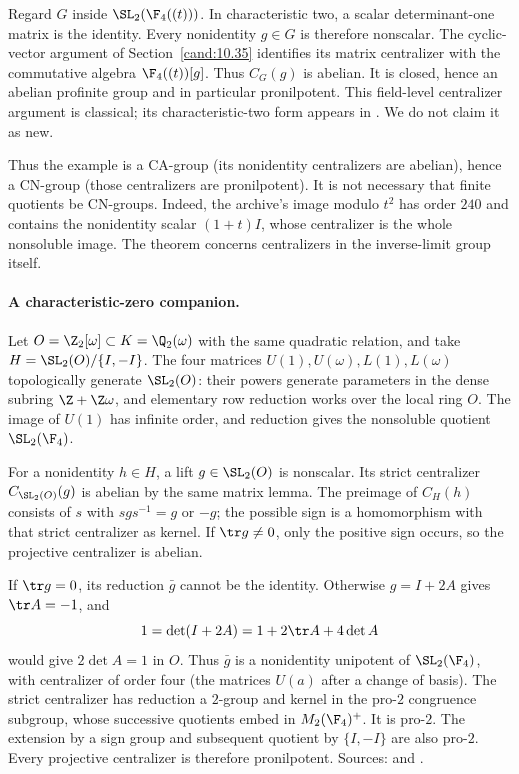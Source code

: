 Regard \(G\) inside \(\SL_2(\F_4((t)))\). In characteristic
two, a scalar determinant-one matrix is the identity.
Every nonidentity \(g\in G\) is therefore nonscalar.
The cyclic-vector argument of Section~\ref{cand:10.35}
identifies its matrix centralizer with the commutative algebra
\(\F_4((t))[g]\). Thus \(C_G(g)\) is abelian.
It is closed, hence an abelian profinite group and in
particular pronilpotent. This field-level centralizer
argument is classical; its characteristic-two form appears
in \cite{fine-ct}. We do not claim it as new.

Thus the example is a CA-group (its nonidentity centralizers are
abelian), hence a CN-group (those centralizers are pronilpotent).
It is not necessary that finite quotients be CN-groups.
Indeed, the archive's image modulo \(t^2\) has order \(240\)
and contains the nonidentity scalar \((1+t)I\), whose
centralizer is the whole nonsoluble image. The theorem
concerns centralizers in the inverse-limit group itself.

\paragraph{A characteristic-zero companion.}
Let \(O=\Z_2[\omega]\subset K=\Q_2(\omega)\) with the same
quadratic relation, and take
\(H=\SL_2(O)/\{I,-I\}\).
The four matrices \(U(1),U(\omega),L(1),L(\omega)\)
topologically generate \(\SL_2(O)\): their powers generate
parameters in the dense subring \(\Z+\Z\omega\), and
elementary row reduction works over the local ring \(O\).
The image of \(U(1)\) has infinite order, and reduction
gives the nonsoluble quotient \(\SL_2(\F_4)\).

For a nonidentity \(h\in H\), a lift \(g\in\SL_2(O)\)
is nonscalar. Its strict centralizer \(C_{\SL_2(O)}(g)\)
is abelian by the same matrix lemma. The preimage of
\(C_H(h)\) consists of \(s\) with \(sgs^{-1}=g\) or \(-g\);
the possible sign is a homomorphism with that strict
centralizer as kernel. If \(\tr g\ne0\), only the
positive sign occurs, so the projective centralizer is
abelian.

If \(\tr g=0\), its reduction \(\bar g\) cannot be the
identity. Otherwise \(g=I+2A\) gives \(\tr A=-1\), and
\[
 1=\det(I+2A)=1+2\tr A+4\det A
\]
would give \(2\det A=1\) in \(O\).
Thus \(\bar g\) is a nonidentity unipotent of
\(\SL_2(\F_4)\), with centralizer of order four
(the matrices \(U(a)\) after a change of basis).
The strict centralizer has reduction a \(2\)-group and
kernel in the pro-\(2\) congruence subgroup, whose
successive quotients embed in \(M_2(\F_4)^+\).
It is pro-\(2\). The extension by a sign group and
subsequent quotient by \(\{I,-I\}\) are also pro-\(2\).
Every projective centralizer is therefore pronilpotent.
Sources:  and
.

